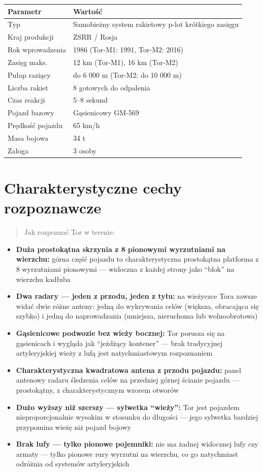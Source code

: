 \documentclass[12pt,openany,oneside]{book}
\providecommand{\tightlist}{%
  \setlength{\itemsep}{0pt}\setlength{\parskip}{0pt}}
\begin{document}
\begin{longtable}[]{@{}ll@{}}
\toprule\noalign{}
Parametr & Wartość \\
\midrule\noalign{}
\endhead
\bottomrule\noalign{}
\endlastfoot
Typ & Samobieżny system rakietowy p-lot krótkiego zasięgu \\
Kraj produkcji & ZSRR / Rosja \\
Rok wprowadzenia & 1986 (Tor-M1: 1991, Tor-M2: 2016) \\
Zasięg maks. & 12 km (Tor-M1), 16 km (Tor-M2) \\
Pułap raziący & do 6 000 m (Tor-M2: do 10 000 m) \\
Liczba rakiet & 8 gotowych do odpalenia \\
Czas reakcji & 5--8 sekund \\
Pojazd bazowy & Gąsienicowy GM-569 \\
Prędkość pojazdu & 65 km/h \\
Masa bojowa & 34 t \\
Załoga & 3 osoby \\
\end{longtable}

\section{Charakterystyczne cechy
rozpoznawcze}\label{charakterystyczne-cechy-rozpoznawcze-29}

\begin{quote}
Jak rozpoznać Tor w terenie:
\end{quote}

\begin{itemize}
\tightlist
\item
  \textbf{Duża prostokątna skrzynia z 8 pionowymi wyrzutniami na
  wierzchu:} górna część pojazdu to charakterystyczna prostokątna
  platforma z 8 wyrzutniami pionowymi --- widoczna z każdej strony jako
  ``blok'' na wierzchu kadłuba
\item
  \textbf{Dwa radary --- jeden z przodu, jeden z tyłu:} na wieżyczce
  Tora zawsze widać dwie różne anteny: jedną do wykrywania celów
  (większa, obracająca się szybko) i jedną do naprowadzania (mniejsza,
  nieruchoma lub wolnoobrotowa)
\item
  \textbf{Gąsienicowe podwozie bez wieży bocznej:} Tor porusza się na
  gąsienicach i wygląda jak ``jeżdżący kontener'' --- brak tradycyjnej
  artyleryjskiej wieży z lufą jest natychmiastowym rozpoznaniem
\item
  \textbf{Charakterystyczna kwadratowa antena z przodu pojazdu:} panel
  antenowy radaru śledzenia celów na przedniej górnej ścianie pojazdu
  --- prostokątny, z charakterystycznym wzorem otworów
\item
  \textbf{Dużo wyższy niż szerszy --- sylwetka ``wieży'':} Tor jest
  pojazdem nieproporcjonalnie wysokim w stosunku do długości --- jego
  sylwetka bardziej przypomina wieżę niż pojazd bojowy
\item
  \textbf{Brak lufy --- tylko pionowe pojemniki:} nie ma żadnej
  widocznej lufy czy armaty --- tylko pionowe rury wyrzutni na wierzchu,
  co go natychmiast odróżnia od systemów artyleryjskich
\end{itemize}
\end{document}
